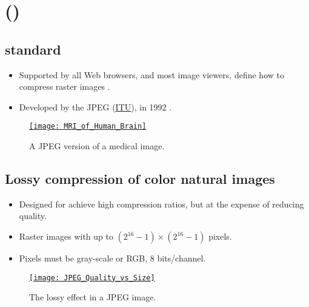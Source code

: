 \chapter{ ()}

\section{ standard}
\begin{itemize}
\item Supported by all Web browsers, and most image viewers, define
  how to compress raster images \cite{ccitt.t81,wikipedia_ITU}.
\item Developed by the \gls{JPEG} (\href{https://www.itu.int}{ITU}),
  in 1992 \cite{wikipedia_JPEG}.
\end{itemize}

\begin{figure}[H]
  \vspace{-2ex}
  \centering
  \href{https://en.wikipedia.org/wiki/Magnetic_resonance_imaging_of_the_brain#/media/File:MRI_of_Human_Brain.jpg}{\texttt{[image: MRI\_of\_Human\_Brain]}}
  \caption{A \gls{JPEG} version of a medical image.}
  \label{fig:JPEG_example}
\end{figure}

\section{Lossy compression of color natural images}
\begin{itemize}
\item Designed for achieve high compression ratios, but at the expense of reducing quality.
  \item Raster images with up to $(2^{16}-1)\times (2^{16}-1)$ pixels.
  \item Pixels must be gray-scale or \gls{RGB}, 8 bits/channel.
\end{itemize}

\begin{figure}[H]
  \vspace{-0ex}
  \centering
  \href{https://www.thewebmaster.com/jpeg-definitive-guide/}{\texttt{[image: JPEG\_Quality\_vs\_Size]}}
  \caption{The lossy effect in a \gls{JPEG} image.}
  \label{fig:JPEG_lossy}
\end{figure}

